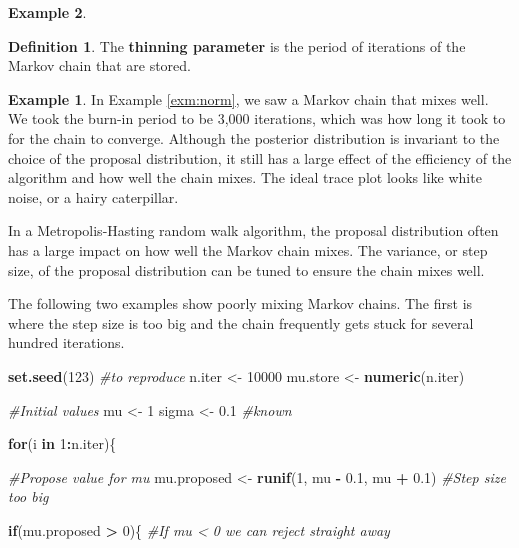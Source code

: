 \documentclass[
]{book}
\newenvironment{Shaded}{\begin{snugshade}}{\end{snugshade}}
\newcommand{\CommentTok}[1]{\textcolor[rgb]{0.56,0.35,0.01}{\textit{#1}}}
\newcommand{\ControlFlowTok}[1]{\textcolor[rgb]{0.13,0.29,0.53}{\textbf{#1}}}
\newcommand{\DecValTok}[1]{\textcolor[rgb]{0.00,0.00,0.81}{#1}}
\newcommand{\FloatTok}[1]{\textcolor[rgb]{0.00,0.00,0.81}{#1}}
\newcommand{\FunctionTok}[1]{\textcolor[rgb]{0.13,0.29,0.53}{\textbf{#1}}}
\newcommand{\NormalTok}[1]{#1}
\newcommand{\OtherTok}[1]{\textcolor[rgb]{0.56,0.35,0.01}{#1}}
\newcommand{\SpecialCharTok}[1]{\textcolor[rgb]{0.81,0.36,0.00}{\textbf{#1}}}
\theoremstyle{definition}
\newtheorem{definition}{Definition}[chapter]
\theoremstyle{definition}
\newtheorem{example}{Example}[chapter]
\theoremstyle{definition}
\theoremstyle{definition}
\theoremstyle{remark}
\begin{document}
\begin{example}
\begin{definition}
The \textbf{thinning parameter} is the period of iterations of the Markov chain that are stored.
\end{definition}

\begin{example}
In Example \ref{exm:norm}, we saw a Markov chain that mixes well. We took the burn-in period to be 3,000 iterations, which was how long it took to for the chain to converge. Although the posterior distribution is invariant to the choice of the proposal distribution, it still has a large effect of the efficiency of the algorithm and how well the chain mixes. The ideal trace plot looks like white noise, or a hairy caterpillar.

In a Metropolis-Hasting random walk algorithm, the proposal distribution often has a large impact on how well the Markov chain mixes. The variance, or step size, of the proposal distribution can be tuned to ensure the chain mixes well.

The following two examples show poorly mixing Markov chains. The first is where the step size is too big and the chain frequently gets stuck for several hundred iterations.

\begin{Shaded}
\begin{Highlighting}[]
\FunctionTok{set.seed}\NormalTok{(}\DecValTok{123}\NormalTok{) }\CommentTok{\#to reproduce}
\NormalTok{n.iter   }\OtherTok{\textless{}{-}} \DecValTok{10000}
\NormalTok{mu.store }\OtherTok{\textless{}{-}} \FunctionTok{numeric}\NormalTok{(n.iter)}

\CommentTok{\#Initial values}
\NormalTok{mu }\OtherTok{\textless{}{-}} \DecValTok{1} 
\NormalTok{sigma }\OtherTok{\textless{}{-}} \FloatTok{0.1} \CommentTok{\#known}

\ControlFlowTok{for}\NormalTok{(i }\ControlFlowTok{in} \DecValTok{1}\SpecialCharTok{:}\NormalTok{n.iter)\{}
  
  \CommentTok{\#Propose value for mu}
\NormalTok{  mu.proposed }\OtherTok{\textless{}{-}} \FunctionTok{runif}\NormalTok{(}\DecValTok{1}\NormalTok{, mu }\SpecialCharTok{{-}} \FloatTok{0.1}\NormalTok{, mu }\SpecialCharTok{+} \FloatTok{0.1}\NormalTok{) }\CommentTok{\#Step size too big}
  
  \ControlFlowTok{if}\NormalTok{(mu.proposed }\SpecialCharTok{\textgreater{}} \DecValTok{0}\NormalTok{)\{ }\CommentTok{\#If mu \textless{} 0 we can reject straight away}
    

\end{Highlighting}
\end{Shaded}
\end{example}
\end{example}
\end{document}
